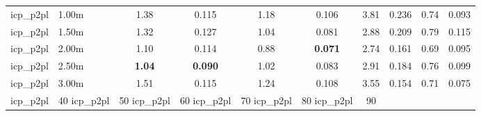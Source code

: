 \begin{tabular}{llcccccccc}
icp\_p2pl & 1.00m & 1.38 & 0.115 & 1.18 & 0.106 & 3.81 & 0.236 & 0.74 & 0.093 \\
icp\_p2pl & 1.50m & 1.32 & 0.127 & 1.04 & 0.081 & 2.88 & 0.209 & 0.79 & 0.115 \\
icp\_p2pl & 2.00m & 1.10 & 0.114 & 0.88 & \bfseries 0.071 & 2.74 & 0.161 & 0.69 & 0.095 \\
icp\_p2pl & 2.50m & \bfseries 1.04 & \bfseries 0.090 & 1.02 & 0.083 & 2.91 & 0.184 & 0.76 & 0.099 \\
icp\_p2pl & 3.00m & 1.51 & 0.115 & 1.24 & 0.108 & 3.55 & 0.154 & 0.71 & 0.075 \\
icp\_p2pl & 40%
icp\_p2pl & 50%
icp\_p2pl & 60%
icp\_p2pl & 70%
icp\_p2pl & 80%
icp\_p2pl & 90%
\bottomrule
\end{tabular}
